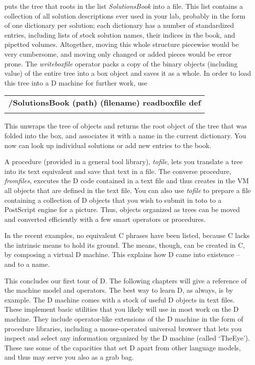 \noindent puts the tree that roots in the list \emph{SolutionsBook} into a file. This list contains a collection of all solution descriptions ever used in your lab, probably in the form of one dictionary per solution; each dictionary has a number of standardized entries, including lists of stock solution names, their indices in the book, and pipetted volumes. Altogether, moving this whole structure piecewise would be very cumbersome, and moving only changed or added pieces would be error prone. The \emph{writeboxfile} operator packs a copy of the binary objects (including value)  of the entire tree into a box object and saves it as a whole. In order to load this tree into a D machine for further work, use\\

\begin{tabular}{>{\sffamily\bfseries}l}
 /SolutionsBook (path) (filename) readboxfile def\\\\
\end{tabular}

\noindent This unwraps the tree of objects and returns the root object of the tree that was folded into the box, and associates it with a name in the current dictionary. You now can look up individual solutions or add new entries to the book.

A  procedure (provided in a general tool  library), \emph{tofile},  lets  you translate  a tree into its text equivalent and save that text in a  file. The  converse procedure, \emph{fromfiles},  executes the D code contained in  a text file and thus creates in the VM all objects that are defined in  the  text  file.  You can also use \emph{tofile} to prepare a  file  containing  a collection  of D objects that you wish to submit in toto to a  PostScript engine for a picture. Thus, objects organized as trees can be moved and converted efficiently with a few smart operators or procedures.

In  the  recent  examples,  no equivalent C phrases  have  been  listed, because  C  lacks  the intrinsic means to hold  its  ground.  The  means, though,  can be created in C, by composing a virtual D machine. This explains how D came into existence -- and to a name.

This concludes our first tour of D. The following chapters will give a reference of the machine model and operators.  The best way to learn D,  as always,  is by example.  The D machine comes with a stock of useful D objects in text files. These implement basic utilities that you likely will use in most work on the D machine. They include operator-like extensions of  the D machine in the form of procedure libraries, including a mouse-operated universal browser that lets you inspect and select any information organized by the D machine (called `TheEye'). These use some of the capacities that set D apart from other language models, and thus may serve you also as a grab bag.

